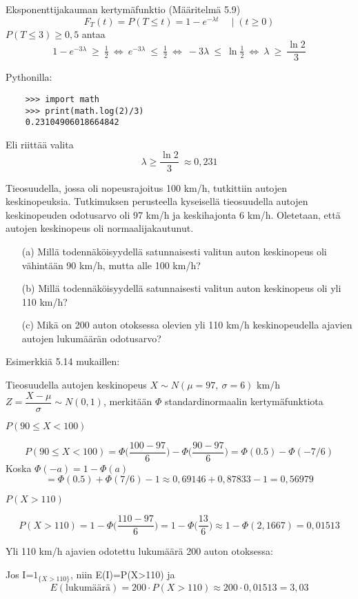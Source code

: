 \documentclass[12pt,a4paper]{article}
\begin{document}
Eksponenttijakauman kertymäfunktio (Määritelmä 5.9)
\[
F_T(t)=P(T\le t)=1-e^{-\lambda t}\quad \mid(t\ge 0)
\]
$P(T\le 3)\ge 0{,}5$ antaa
\[
1-e^{-3\lambda}\ \ge\ \tfrac12
\ \Longleftrightarrow\
e^{-3\lambda}\ \le\ \tfrac12
\ \Longleftrightarrow\
-3\lambda\ \le\ \ln\tfrac12
\ \Longleftrightarrow\
\lambda\ \ge\ \frac{\ln 2}{3}
\]

Pythonilla:
\begin{verbatim}
    >>> import math
    >>> print(math.log(2)/3)
    0.23104906018664842
\end{verbatim}

Eli riittää valita 
\[
\lambda \ge \dfrac{\ln 2}{3}\ \approx 0{,}231
\]







\pagebreak
{}
Tieosuudella, jossa oli nopeusrajoitus 100 km/h, tutkittiin autojen keskinopeuksia. Tutkimuksen perusteella kyseisellä tieosuudella autojen keskinopeuden odotusarvo oli 97 km/h ja keskihajonta 6 km/h. Oletetaan, että autojen keskinopeus oli normaalijakautunut.
\begin{enumerate}
\item[(a)] Millä todennäköisyydellä satunnaisesti valitun auton keskinopeus oli vähintään 90 km/h, mutta alle 100 km/h?
\item[(b)] Millä todennäköisyydellä satunnaisesti valitun auton keskinopeus oli yli 110 km/h?
\item[(c)] Mikä on 200 auton otoksessa olevien yli 110 km/h keskinopeudella ajavien autojen lukumäärän odotusarvo?
\end{enumerate}
\vspace{0.8cm}


Esimerkkiä 5.14 mukaillen:
\vspace{0.2cm}

Tieosuudella autojen keskinopeus 
$X\sim N(\mu=97,\ \sigma=6)$ km/h\\

$Z=\dfrac{X-\mu}{\sigma}\sim N(0,1)$, merkitään $\Phi$ standardinormaalin kertymäfunktiota

\begin{kohta}
  \item $P(90\le X<100)$

  \[
  P(90\le X<100)=\Phi\!\Big(\frac{100-97}{6}\Big)-\Phi\!\Big(\frac{90-97}{6}\Big)
  =\Phi(0.5)-\Phi(-7/6)
  \]
  Koska $\Phi(-a)=1-\Phi(a)$
  \[
  =\Phi(0.5)+\Phi(7/6)-1 \approx 0{,}69146+0{,}87833-1
  = 0{,}56979
  \]

  \item $P(X>110)$

  \[
  P(X>110)=1-\Phi\!\Big(\frac{110-97}{6}\Big)=1-\Phi\!\Big(\frac{13}{6}\Big)
  \approx 1-\Phi(2{,}1667)=0{,}01513
  \]

  \item Yli 110 km/h ajavien odotettu lukumäärä 200 auton otoksessa:

  Jos I=$1_{\{X>110\}}$, niin E(I)=P(X>110) ja
  \[
  E(\text{lukumäärä})=200\cdot P(X>110)\approx 200\cdot 0{,}01513
  = 3{,}03
  \]
\end{kohta}
\end{document}
